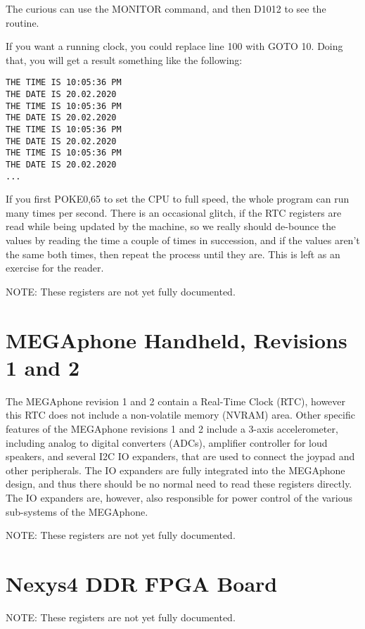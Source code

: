 The curious can use the MONITOR command, and then D1012 to see the routine.

If you want a running clock, you could replace line 100 with GOTO 10.  Doing that, you will get a result something like the following:

\begin{tcolorbox}[colback=black,coltext=white]
\verbatimfont{\codefont}
\begin{verbatim}
THE TIME IS 10:05:36 PM
THE DATE IS 20.02.2020
THE TIME IS 10:05:36 PM
THE DATE IS 20.02.2020
THE TIME IS 10:05:36 PM
THE DATE IS 20.02.2020
THE TIME IS 10:05:36 PM
THE DATE IS 20.02.2020
...
\end{verbatim}
\end{tcolorbox}


If you first POKE0,65 to set the CPU to full speed, the whole program can run many times per second. There is an occasional glitch, if the RTC registers are read while being updated by the machine, so we really should de-bounce the values by reading the time a couple of times in succession, and if the values aren't the same both times, then repeat the process until they are. This is left as an exercise for the reader.

NOTE: These registers are not yet fully documented.



\section{MEGAphone Handheld, Revisions 1 and 2}

The MEGAphone revision 1 and 2 contain a Real-Time Clock (RTC), however this RTC does not include a non-volatile memory (NVRAM)
area.  Other specific features of the MEGAphone revisions 1 and 2 include a 3-axis accelerometer, including analog to digital
converters (ADCs), amplifier controller for loud speakers, and several I2C IO expanders, that are used to connect the joypad and other peripherals. The IO expanders are
fully integrated into the MEGAphone design, and thus there should be no normal need to read these registers directly.  The IO
expanders are, however, also responsible for power control of the various sub-systems of the MEGAphone.  

NOTE: These registers are not yet fully documented.



\section{Nexys4 DDR FPGA Board}

NOTE: These registers are not yet fully documented.

%

